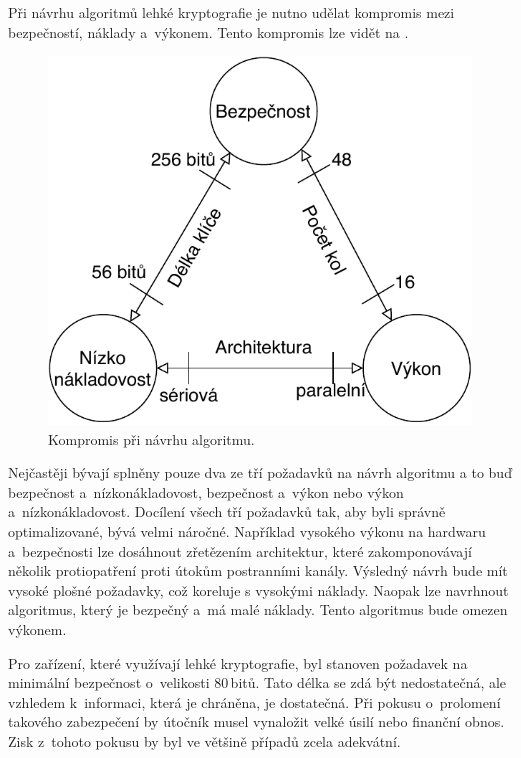 Při návrhu algoritmů lehké kryptografie je nutno udělat kompromis mezi bezpečností, náklady a~výkonem. Tento kompromis lze vidět na . 
\begin{figure}[!h]
  \begin{center}
    \includegraphics[scale=0.7]{obrazky/designTradeOFF.pdf}
  \end{center}
  \caption[Kompromis při návrhu algoritmu]{Kompromis při návrhu algoritmu.\cite{PoschmannCrypto}}
  \label{img:Compromis}
\end{figure}

Nejčastěji bývají splněny pouze dva ze tří požadavků na návrh algoritmu a to buď bezpečnost a~nízkonákladovost, bezpečnost a~výkon nebo výkon a~nízkonákladovost. Docílení všech tří požadavků tak, aby byli správně optimalizované, bývá velmi náročné. Například vysokého výkonu na hardwaru a~bezpečnosti lze dosáhnout zřetězením architektur, které zakomponovávají několik protiopatření proti útokům postranními kanály. Výsledný návrh bude mít vysoké plošné požadavky, což koreluje s vysokými náklady. Naopak lze navrhnout algoritmus, který je bezpečný a~má malé náklady. Tento algoritmus bude omezen výkonem.\cite{PoschmannCrypto}

Pro zařízení, které využívají lehké kryptografie, byl stanoven požadavek na minimální bezpečnost o~velikosti 80\,bitů. Tato délka se zdá být nedostatečná, ale vzhledem k~informaci, která je chráněna, je dostatečná. Při pokusu o~prolomení takového zabezpečení by útočník musel vynaložit velké úsilí nebo finanční obnos. Zisk z~tohoto pokusu by byl ve většině případů zcela adekvátní.\cite{Klima}

